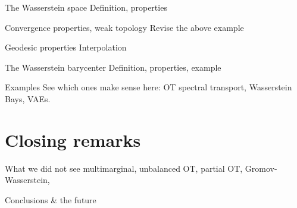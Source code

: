 \documentclass[pdf,aspectratio=169,10pt]{beamer}
\begin{document}
\begin{frame}{The Wasserstein space}
    Definition, properties
\end{frame}

\begin{frame}{Convergence properties, weak topology}
    Revise the above example
\end{frame}


\begin{frame}{Geodesic properties}
    Interpolation
\end{frame}

\begin{frame}{The Wasserstein barycenter}
    Definition, properties, example
\end{frame}


\begin{frame}{Examples}
    See which ones make sense here:  OT spectral transport, Wasserstein Bays, VAEs.
\end{frame}


\section{Closing remarks}

\begin{frame}{What we did not see}
   multimarginal, unbalanced OT, partial OT, Gromov-Wasserstein, 
\end{frame}


\begin{frame}{Conclusions \& the future}
\end{frame}






\begin{frame}[plain]
    \titlepage
\end{frame}
\end{document}
